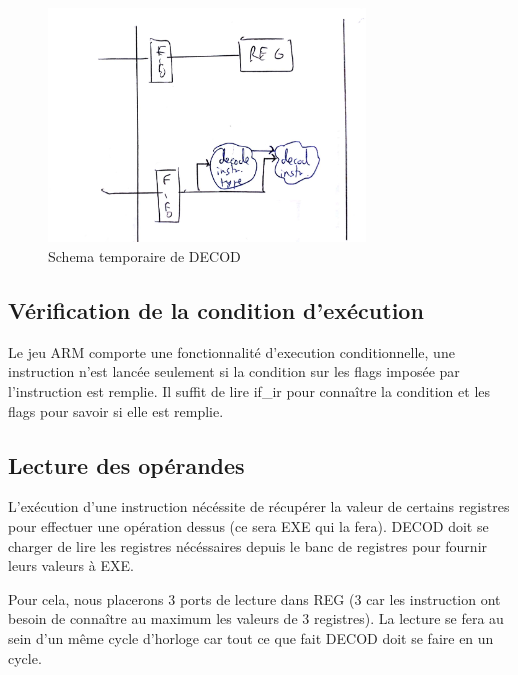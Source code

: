 \documentclass{article}
\begin{document}
\begin{figure}[H]
\includegraphics[width=0.75\textwidth]{pics/dec3.png}
\centering
\caption{Schema temporaire de DECOD}
\label{dec3}
\end{figure}

\subsection{Vérification de la condition d'exécution}

Le jeu ARM comporte une fonctionnalité d'execution conditionnelle,
une instruction n'est lancée seulement si la condition sur les flags imposée
par l'instruction est remplie. Il suffit de lire if\_ir pour connaître la condition
et les flags pour savoir si elle est remplie.

\subsection{Lecture des opérandes}

L'exécution d'une instruction nécéssite de récupérer la valeur de certains registres pour
effectuer une opération dessus (ce sera EXE qui la fera). DECOD doit se charger
de lire les registres nécéssaires depuis le banc de registres pour fournir leurs valeurs à EXE.

Pour cela, nous placerons 3 ports de lecture dans REG (3 car les instruction ont besoin de
connaître au maximum les valeurs de 3 registres). La lecture se fera au sein d'un même cycle d'horloge
car tout ce que fait DECOD doit se faire en un cycle.
\end{document}

